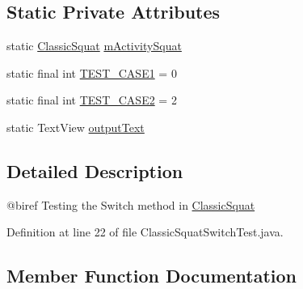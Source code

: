 \subsection*{Static Private Attributes}
\begin{DoxyCompactItemize}
\item 
static \mbox{\hyperlink{classcom_1_1example_1_1trainawearapplication_1_1_classic_squat}{Classic\+Squat}} \mbox{\hyperlink{classcom_1_1example_1_1trainawearapplication_1_1_classic_squat_switch_test_a7a9e3a214af971f6f33cffabd8297902}{m\+Activity\+Squat}}
\item 
static final int \mbox{\hyperlink{classcom_1_1example_1_1trainawearapplication_1_1_classic_squat_switch_test_ad7aca3b01b79d4797ff05766d3e15059}{T\+E\+S\+T\+\_\+\+C\+A\+S\+E1}} = 0
\item 
static final int \mbox{\hyperlink{classcom_1_1example_1_1trainawearapplication_1_1_classic_squat_switch_test_adfafc37af9e307475f809327d404008d}{T\+E\+S\+T\+\_\+\+C\+A\+S\+E2}} = 2
\item 
static Text\+View \mbox{\hyperlink{classcom_1_1example_1_1trainawearapplication_1_1_classic_squat_switch_test_a5942ceb5c90ba3b912bb91020e3989ee}{output\+Text}}
\end{DoxyCompactItemize}


\subsection{Detailed Description}
@biref Testing the Switch method in \mbox{\hyperlink{classcom_1_1example_1_1trainawearapplication_1_1_classic_squat}{Classic\+Squat}} 

Definition at line 22 of file Classic\+Squat\+Switch\+Test.\+java.



\subsection{Member Function Documentation}
\mbox{\label{classcom_1_1example_1_1trainawearapplication_1_1_classic_squat_switch_test_adca8046d4e95d7ca68bbc42ad0cf5d49}} 
